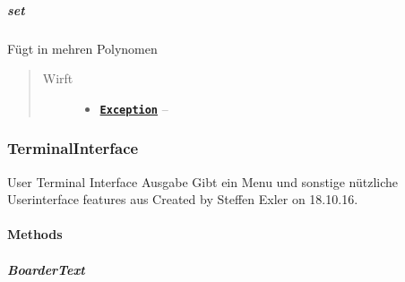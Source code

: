 \documentclass[letterpaper,10pt,ngerman]{sphinxmanual}
\begin{document}
\subparagraph{set}
\label{com/linuxluigi/polynomial/PolynomialTest:set}

\begin{fulllineitems}
\label{com/linuxluigi/polynomial/PolynomialTest:com.linuxluigi.polynomial.PolynomialTest.set()}
Fügt in mehren Polynomen
\begin{quote}\begin{description}
\item[{Wirft}] \leavevmode\begin{itemize}
\item {} 
\href{http://docs.oracle.com/javase/6/docs/api/java/lang/Exception.html}{\textbf{\texttt{Exception}}} -- 

\end{itemize}

\end{description}\end{quote}

\end{fulllineitems}



\subsubsection{TerminalInterface}
\label{com/linuxluigi/polynomial/TerminalInterface::doc}\label{com/linuxluigi/polynomial/TerminalInterface:terminalinterface}

\begin{fulllineitems}
\label{com/linuxluigi/polynomial/TerminalInterface:com.linuxluigi.polynomial.TerminalInterface}
User Terminal Interface Ausgabe Gibt ein Menu und sonstige nützliche Userinterface features aus Created by Steffen Exler on 18.10.16.

\end{fulllineitems}



\paragraph{Methods}
\label{com/linuxluigi/polynomial/TerminalInterface:methods}

\subparagraph{BoarderText}
\label{com/linuxluigi/polynomial/TerminalInterface:boardertext}
\end{document}

